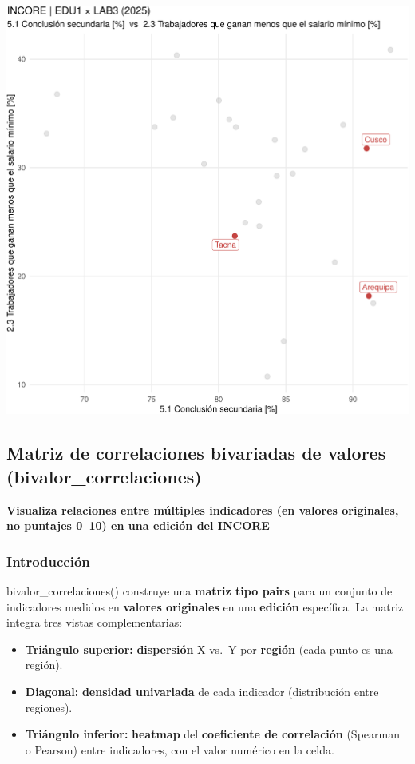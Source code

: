 \documentclass[
  11pt,
  letterpaper,
  DIV=11,
  numbers=noendperiod]{scrartcl}
\begin{document}
\includegraphics{Manual_files/figure-pdf/unnamed-chunk-112-1.pdf}

\subsection{\texorpdfstring{\textbf{Matriz de correlaciones bivariadas
de valores
(bivalor\_correlaciones)}}{Matriz de correlaciones bivariadas de valores (bivalor\_correlaciones)}}\label{matriz-de-correlaciones-bivariadas-de-valores-bivalor_correlaciones}

\textbf{Visualiza relaciones entre múltiples indicadores (en valores
originales, no puntajes 0--10) en una edición del INCORE}

\subsubsection{\texorpdfstring{\textbf{Introducción}}{Introducción}}\label{introducciuxf3n-12}

bivalor\_correlaciones() construye una \textbf{matriz tipo pairs} para
un conjunto de indicadores medidos en \textbf{valores originales} en una
\textbf{edición} específica. La matriz integra tres vistas
complementarias:

\begin{itemize}
\item
  \textbf{Triángulo superior:} \textbf{dispersión} X vs.~Y por
  \textbf{región} (cada punto es una región).
\item
  \textbf{Diagonal:} \textbf{densidad univariada} de cada indicador
  (distribución entre regiones).
\item
  \textbf{Triángulo inferior:} \textbf{heatmap} del \textbf{coeficiente
  de correlación} (Spearman o Pearson) entre indicadores, con el valor
  numérico en la celda.
\end{itemize}
\end{document}
